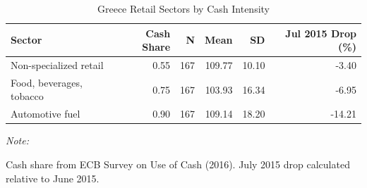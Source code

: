 \begin{table}[!h]
\centering
\caption{\label{tab:tab1b}Greece Retail Sectors by Cash Intensity}
\centering
\begin{threeparttable}
\begin{tabular}[t]{lrrrrr}
\toprule
Sector & Cash Share & N & Mean & SD & Jul 2015 Drop (\%)\\
\midrule
Non-specialized retail & 0.55 & 167 & 109.77 & 10.10 & -3.40\\
Food, beverages, tobacco & 0.75 & 167 & 103.93 & 16.34 & -6.95\\
Automotive fuel & 0.90 & 167 & 109.14 & 18.20 & -14.21\\
\bottomrule
\end{tabular}
\begin{tablenotes}
\item \textit{Note: } 
\item Cash share from ECB Survey on Use of Cash (2016). July 2015 drop calculated relative to June 2015.
\end{tablenotes}
\end{threeparttable}
\end{table}
